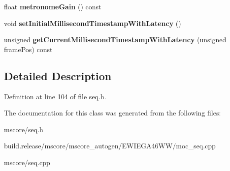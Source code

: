 \begin{DoxyCompactItemize}
\mbox{\label{class_ms_1_1_seq_a9d204b6a5041b1d9ed57b39447c29aeb}} 
float {\bfseries metronome\+Gain} () const
\item 
\mbox{\label{class_ms_1_1_seq_a7837b3bb685ed780d352523bbff3bdba}} 
void {\bfseries set\+Initial\+Millisecond\+Timestamp\+With\+Latency} ()
\item 
\mbox{\label{class_ms_1_1_seq_ac3a7e036c992f70ca6ac66ec5a8c09f7}} 
unsigned {\bfseries get\+Current\+Millisecond\+Timestamp\+With\+Latency} (unsigned frame\+Pos) const
\end{DoxyCompactItemize}


\subsection{Detailed Description}


Definition at line 104 of file seq.\+h.



The documentation for this class was generated from the following files\+:\begin{DoxyCompactItemize}
\item 
mscore/seq.\+h\item 
build.\+release/mscore/mscore\+\_\+autogen/\+E\+W\+I\+E\+G\+A46\+W\+W/moc\+\_\+seq.\+cpp\item 
mscore/seq.\+cpp\end{DoxyCompactItemize}
